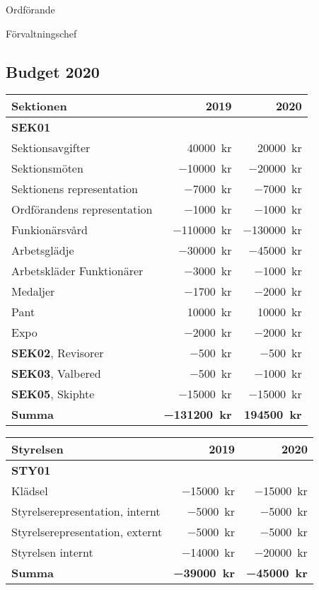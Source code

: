 \documentclass[../_main/handlingar.tex]{subfiles}
\begin{document}
\begin{signatures}{2}
    \ist
    \signature{\ordf}{Ordförande}
    \signature{\fvc}{Förvaltningschef}
\end{signatures}

\newpage
\subsection*{Budget 2020}
\begin{tabularx}{10cm}{X r r}
    \textbf{\large Sektionen} & \textbf{2019} & \textbf{2020} \\
    \hline
    \textbf{SEK01} \\
    Sektionsavgifter & \SI{40000}{kr} & \SI{20000}{kr} \\
    Sektionsmöten & \SI{-10000}{kr} & \SI{-20000}{kr} \\
    Sektionens representation & \SI{-7000}{kr} & \SI{-7000}{kr} \\
    Ordförandens representation & \SI{-1000}{kr} & \SI{-1000}{kr} \\
    Funkionärsvård & \SI{-110000}{kr} & \SI{-130000}{kr} \\
    Arbetsglädje & \SI{-30000}{kr} & \SI{-45000}{kr} \\
    Arbetskläder Funktionärer & \SI{-3000}{kr} & \SI{-1000}{kr} \\
    Medaljer & \SI{-1700}{kr} & \SI{-2000}{kr} \\
    Pant & \SI{10000}{kr} & \SI{10000}{kr} \\
    Expo & \SI{-2000}{kr} & \SI{-2000}{kr} \\
    \textbf{SEK02}, Revisorer & \SI{-500}{kr} & \SI{-500}{kr} \\
    \textbf{SEK03}, Valbered & \SI{-500}{kr} & \SI{-1000}{kr} \\
    \textbf{SEK05}, Skiphte & \SI{-15000}{kr} & \SI{-15000}{kr} \\
    \hline
    \textbf{Summa} & \textbf{\SI{-131200}{kr}} & \textbf{\SI{194500}{kr}} \\
\end{tabularx}

\begin{tabularx}{10cm}{X r r}
    \textbf{\large Styrelsen} & \textbf{2019} & \textbf{2020} \\
    \hline
    \textbf{STY01} \\
    Klädsel & \SI{-15000}{kr} & \SI{-15000}{kr} \\
    Styrelserepresentation, internt & \SI{-5000}{kr} & \SI{-5000}{kr} \\
    Styrelserepresentation, externt & \SI{-5000}{kr} & \SI{-5000}{kr} \\
    Styrelsen internt & \SI{-14000}{kr} & \SI{-20000}{kr} \\
    \hline
    \textbf{Summa} & \textbf{\SI{-39000}{kr}} & \textbf{\SI{-45000}{kr}} \\
\end{tabularx}
\end{document}
